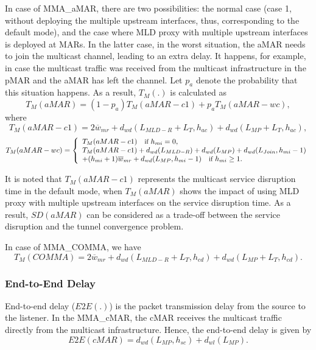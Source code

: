 In case of MMA\_aMAR, there are two possibilities: the normal case (case 1, without deploying the multiple upstream interfaces, thus, corresponding to the default mode), and the case where MLD proxy with multiple upstream interfaces is deployed at MARs. In the latter case, in the worst situation, the aMAR needs to join the multicast channel, leading to an extra delay. It happens, for example, in case the multicast traffic was received from the multicast infrastructure in the pMAR and the aMAR has left the channel. Let $p_{a}$ denote the probability that this situation happens. As a result, $T_{M}(.)$ is calculated as \\
\begin{equation}
T_{M}(aMAR) =(1-p_{a}) T_{M}(aMAR-c1)  +p_{a} T_{M}(aMAR-wc),
\end{equation}
where
\begin{equation}
T_{M}(aMAR-c1) =2\overline{w}_{mr} +d_{wd}(L_{MLD-R}+L_{T},h_{ac})+d_{wd}(L_{MP} +L_{T},h_{ac}),
\end{equation}
\small
\[T_{M}(aMAR-wc)  = \left\{ 
 \begin{array}{l l}
   T_{M}(aMAR-c1)  \quad \small \text{if } h_{mi} =0,  \\
    T_{M}(aMAR-c1)+ d_{wd}(L_{MLD-R})+ d_{wd}(L_{MP})  + d_{wd}(L_{Join},h_{mi}-1) \\+ (h_{mi}+1)  \overline{w}_{mr} +d_{wd}(L_{MP},h_{mi}-1)  \quad \small \text{if }h_{mi} \geq 1. 
 \end{array} \right.\] 
\normalsize 

It is noted that $T_{M}(aMAR-c1)$ represents the multicast service disruption time in the default mode, when $T_{M}(aMAR)$ shows the impact of using MLD proxy with multiple upstream interfaces on the service disruption time. As a result, $SD(aMAR)$ can be considered as a trade-off between the service disruption and the tunnel convergence problem.  

In case of MMA\_COMMA, we have \\
\begin{equation}
T_{M}(COMMA)= 2\overline{w}_{mr}+  d_{wd}(L_{MLD-R}+L_{T}, h_{cd}) + d_{wd}(L_{MP}+L_{T}, h_{cd}).
\end{equation}
\subsubsection{End-to-End Delay}
End-to-end delay ($E2E(.)$) is the packet transmission delay from the source to the listener. In the MMA\_cMAR, the cMAR receives the multicast traffic directly from the multicast infrastructure. Hence, the end-to-end delay is given by\\
\begin{equation}
E2E(cMAR) = d_{wd}(L_{MP},h_{sc}) + d_{wl}(L_{MP}).
\end{equation}

